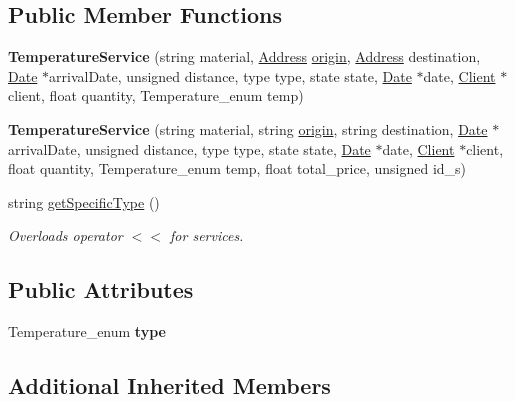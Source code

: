 \subsection*{Public Member Functions}
\begin{DoxyCompactItemize}
\item 
\mbox{\label{class_temperature_service_ade5bfca2ab89523b9492667fed123f6b}} 
{\bfseries Temperature\+Service} (string material, \hyperlink{class_address}{Address} \hyperlink{class_service_a4abd0a104d97e5bdb8e8ca93bab31ce7}{origin}, \hyperlink{class_address}{Address} destination, \hyperlink{class_date}{Date} $\ast$arrival\+Date, unsigned distance, type type, state state, \hyperlink{class_date}{Date} $\ast$date, \hyperlink{class_client}{Client} $\ast$client, float quantity, Temperature\+\_\+enum temp)
\item 
\mbox{\label{class_temperature_service_acd30d1bf1df6432378826b9285e48f9c}} 
{\bfseries Temperature\+Service} (string material, string \hyperlink{class_service_a4abd0a104d97e5bdb8e8ca93bab31ce7}{origin}, string destination, \hyperlink{class_date}{Date} $\ast$arrival\+Date, unsigned distance, type type, state state, \hyperlink{class_date}{Date} $\ast$date, \hyperlink{class_client}{Client} $\ast$client, float quantity, Temperature\+\_\+enum temp, float total\+\_\+price, unsigned id\+\_\+s)
\item 
string \hyperlink{class_temperature_service_afe119e9c22598d454c7355a49f984df5}{get\+Specific\+Type} ()
\begin{DoxyCompactList}\small\item\em Overloads operator $<$$<$ for services. \end{DoxyCompactList}\end{DoxyCompactItemize}
\subsection*{Public Attributes}
\begin{DoxyCompactItemize}
\item 
\mbox{\label{class_temperature_service_a1c6c01171d9ad6e56012440fb85a17bd}} 
Temperature\+\_\+enum {\bfseries type}
\end{DoxyCompactItemize}
\subsection*{Additional Inherited Members}


